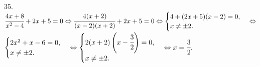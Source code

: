 35. $\cfrac{4x+8}{x^2-4}+2x+5=0\Leftrightarrow\cfrac{4(x+2)}{(x-2)(x+2)}+2x+5=0\Leftrightarrow\begin{cases}
4+(2x+5)(x-2)=0,\\
x\neq\pm2.\end{cases}\Leftrightarrow$\\$\begin{cases}
2x^2+x-6=0,\\
x\neq\pm2.\end{cases}\Leftrightarrow\begin{cases}
2(x+2)\left(x-\cfrac{3}{2}\right)=0,\\
x\neq\pm2.\end{cases}\Leftrightarrow x=\cfrac{3}{2}.$\\
